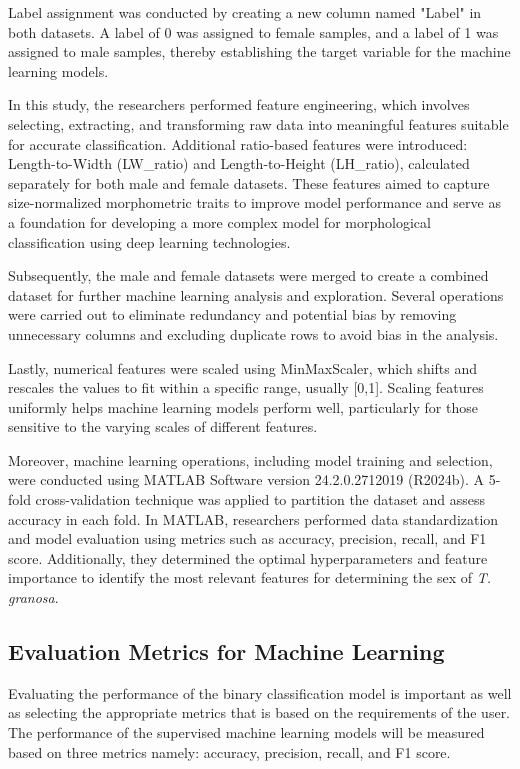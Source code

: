 Label assignment was conducted by creating a new column named "Label" in both datasets. A label of 0 was assigned to female samples, and a label of 1 was assigned to male samples, thereby establishing the target variable for the machine learning models.

In this study, the researchers performed feature engineering, which involves selecting, extracting, and transforming raw data into meaningful features suitable for accurate classification. Additional ratio-based features were introduced: Length-to-Width (LW\_ratio) and Length-to-Height (LH\_ratio), calculated separately for both male and female datasets. These features aimed to capture size-normalized morphometric traits to improve model performance and serve as a foundation for developing a more complex model for morphological classification using deep learning technologies.

Subsequently, the male and female datasets were merged to create a combined dataset for further machine learning analysis and exploration. Several operations were carried out to eliminate redundancy and potential bias by removing unnecessary columns and excluding duplicate rows to avoid bias in the analysis.

Lastly, numerical features were scaled using MinMaxScaler, which shifts and rescales the values to fit within a specific range, usually [0,1]. Scaling features uniformly helps machine learning models perform well, particularly for those sensitive to the varying scales of different features.

Moreover, machine learning operations, including model training and selection, were conducted using MATLAB Software version 24.2.0.2712019 (R2024b). A 5-fold cross-validation technique was applied to partition the dataset and assess accuracy in each fold. In MATLAB, researchers performed data standardization and model evaluation using metrics such as accuracy, precision, recall, and F1 score. Additionally, they determined the optimal hyperparameters and feature importance to identify the most relevant features for determining the sex of \textit{T. granosa}.



\subsection{Evaluation Metrics for Machine Learning}
Evaluating the performance of the binary classification model is important as well as selecting the appropriate metrics that is based on the requirements of the user. The performance of the supervised machine learning models will be measured based on three metrics namely: accuracy, precision, recall, and F1 score. 

